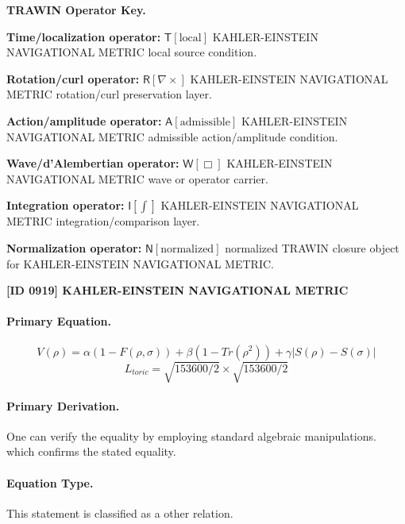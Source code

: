\par\vspace{0.45\baselineskip}
\noindent\begin{minipage}[t]{\linewidth}
\begingroup
\small
\raggedright
\textbf{TRAWIN Operator Key.}\par
\noindent\textbf{Time/localization operator:} $\mathsf{T}\!\left[\mathrm{local}\right]$ KAHLER-EINSTEIN NAVIGATIONAL METRIC local source condition.\par
\noindent\textbf{Rotation/curl operator:} $\mathsf{R}\!\left[\nabla\times\right]$ KAHLER-EINSTEIN NAVIGATIONAL METRIC rotation/curl preservation layer.\par
\noindent\textbf{Action/amplitude operator:} $\mathsf{A}\!\left[\mathrm{admissible}\right]$ KAHLER-EINSTEIN NAVIGATIONAL METRIC admissible action/amplitude condition.\par
\noindent\textbf{Wave/d'Alembertian operator:} $\mathsf{W}\!\left[\Box\right]$ KAHLER-EINSTEIN NAVIGATIONAL METRIC wave or operator carrier.\par
\noindent\textbf{Integration operator:} $\mathsf{I}\!\left[\int\right]$ KAHLER-EINSTEIN NAVIGATIONAL METRIC integration/comparison layer.\par
\noindent\textbf{Normalization operator:} $\mathsf{N}\!\left[\mathrm{normalized}\right]$ normalized TRAWIN closure object for KAHLER-EINSTEIN NAVIGATIONAL METRIC.\par
\endgroup
\end{minipage}

\clearpage
\noindent\textbf{[ID 0919] KAHLER-EINSTEIN NAVIGATIONAL METRIC}\par
\vspace{0.35em}
\paragraph{Primary Equation.}
\[
V(\rho) = \alpha(1 - F(\rho, \sigma)) + \beta(1 - Tr(\rho^2)) + \gamma|S(\rho) - S(\sigma)|
\]
\[
L_{toric} = \sqrt{153600/2} \times \sqrt{153600/2}
\]

\paragraph{Primary Derivation.}
One can verify the equality by employing standard algebraic manipulations. which confirms the stated equality.
\paragraph{Equation Type.}
This statement is classified as a other relation.

